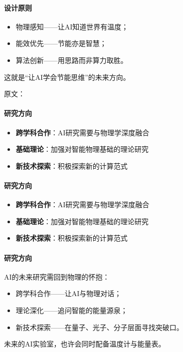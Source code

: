 \paragraph{设计原则}
\begin{itemize}
\item 物理感知——让AI知道世界有温度；
\item 能效优先——节能亦是智慧；
\item 算法创新——用思路而非算力取胜。
\end{itemize}
这就是“让AI学会节能思维”的未来方向。

原文：
\paragraph{研究方向}
\begin{itemize}
\item \textbf{跨学科合作}：AI研究需要与物理学深度融合
\item \textbf{基础理论}：加强对智能物理基础的理论研究
\item \textbf{新技术探索}：积极探索新的计算范式
\end{itemize}
%


\paragraph{研究方向}
\begin{itemize}
\item \textbf{跨学科合作}：AI研究需要与物理学深度融合
\item \textbf{基础理论}：加强对智能物理基础的理论研究
\item \textbf{新技术探索}：积极探索新的计算范式
\end{itemize}
\paragraph{研究方向}
AI的未来研究需回到物理的怀抱：
\begin{itemize}
\item 跨学科合作——让AI与物理对话；
\item 理论深化——追问智能的能量源泉；
\item 新技术探索——在量子、光子、分子层面寻找突破口。
\end{itemize}
未来的AI实验室，也许会同时配备温度计与能量表。

